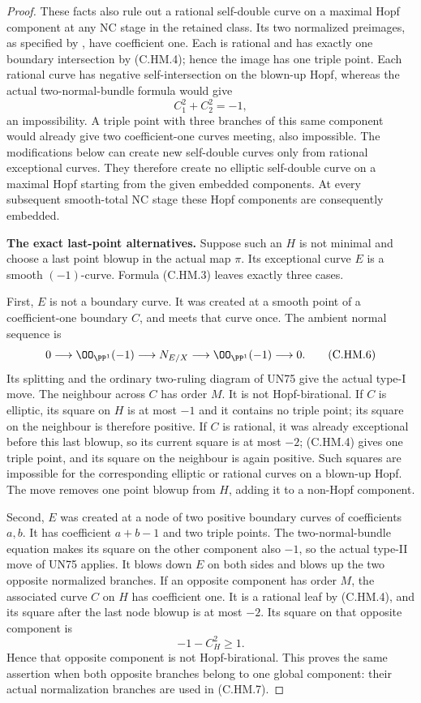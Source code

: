 \begin{proof}
These facts also rule out a rational self-double curve
on a maximal Hopf component at any NC stage in the
retained class.  Its two normalized preimages, as
specified by \cite[\S4.11.2(III)]{Kulikov1977}, have
coefficient one.  Each is rational and has exactly one
boundary intersection by (C.HM.4); hence the image has
one triple point.  Each rational curve has negative
self-intersection on the blown-up Hopf, whereas the
actual two-normal-bundle formula would give
\[
              C_1^2+C_2^2=-1,
\tag{C.HM.5}
\]
an impossibility.  A triple point with three branches
of this same component would already give two
coefficient-one curves meeting, also impossible.
The modifications below can create new self-double
curves only from rational exceptional curves.
They therefore create no elliptic self-double curve
on a maximal Hopf starting from the given embedded
components.  At every subsequent smooth-total NC
stage these Hopf components are consequently embedded.

\par\medskip\noindent\textbf{The exact last-point alternatives.}
Suppose such an \(H\) is not minimal and choose a last
point blowup in the actual map \(\pi\).  Its exceptional
curve \(E\) is a smooth \((-1)\)-curve.  Formula
(C.HM.3) leaves exactly three cases.

First, \(E\) is not a boundary curve.  It was created
at a smooth point of a coefficient-one boundary \(C\),
and meets that curve once.  The ambient normal
sequence is
\[
 0\longrightarrow\OO_{\PP^1}(-1)
 \longrightarrow N_{E/X}
 \longrightarrow\OO_{\PP^1}(-1)\longrightarrow0 .
\tag{C.HM.6}
\]
Its splitting and the ordinary two-ruling diagram of
UN75 give the actual type-I move.  The neighbour across
\(C\) has order \(M\).  It is not Hopf-birational.
If \(C\) is elliptic, its square on \(H\) is at most
\(-1\) and it contains no triple point; its square on
the neighbour is therefore positive.  If \(C\) is
rational, it was already exceptional before this last
blowup, so its current square is at most \(-2\);
(C.HM.4) gives one triple point, and its square on
the neighbour is again positive.  Such squares are
impossible for the corresponding elliptic or rational
curves on a blown-up Hopf.  The move removes one
point blowup from \(H\), adding it to a non-Hopf
component.

Second, \(E\) was created at a node of two positive
boundary curves of coefficients \(a,b\).  It has
coefficient \(a+b-1\) and two triple points.  The
two-normal-bundle equation makes its square on the
other component also \(-1\), so the actual type-II
move of UN75 applies.  It blows down \(E\) on both
sides and blows up the two opposite normalized
branches.  If an opposite component has order \(M\),
the associated curve \(C\) on \(H\) has coefficient
one.  It is a rational leaf by (C.HM.4), and its
square after the last node blowup is at most \(-2\).
Its square on that opposite component is
\[
                 -1-C_H^2\ge1 .
\tag{C.HM.7}
\]
Hence that opposite component is not Hopf-birational.
This proves the same assertion when both opposite
branches belong to one global component: their actual
normalization branches are used in (C.HM.7).


\end{proof}
